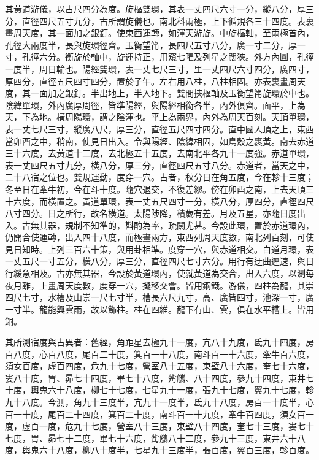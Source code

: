 \begin{pinyinscope}
 其黃道游儀，以古尺四分為度。旋樞雙環，其表一丈四尺六寸一分，縱八分，厚三分，直徑四尺五寸九分，古所謂旋儀也。南北科兩極，上下循規各三十四度。表裏畫周天度，其一面加之銀釘。使東西運轉，如渾天游旋。中旋樞軸，至兩極首內，孔徑大兩度半，長與旋環徑齊。玉衡望筩，長四尺五寸八分，廣一寸二分，厚一寸，孔徑六分。衡旋於軸中，旋運持正，用窺七曜及列星之闊狹。外方內圓，孔徑一度半，周日輪也。陽經雙環，表一丈七尺三寸，里一丈四尺六寸四分，廣四寸，厚四分，直徑五尺四寸四分，置於子午。左右用八柱，八柱相固。亦表裏畫周天度，其一面加之銀釘。半出地上，半入地下。雙間挾樞軸及玉衡望筩旋環於中也。陰緯單環，外內廣厚周徑，皆準陽經，與陽經相銜各半，內外俱齊。面平，上為天，下為地。橫周陽環，謂之陰渾也。平上為兩界，內外為周天百刻。天頂單環，表一丈七尺三寸，縱廣八尺，厚三分，直徑五尺四寸四分。直中國人頂之上，東西當卯酉之中，稍南，使見日出入。令與陽經、陰緯相固，如鳥殼之裹黃。南去赤道三十六度，去黃道十二度，去北極五十五度，去南北平各九十一度強。赤道單環，表一丈四尺五寸九分，橫八分，厚三分，直徑四尺五寸八分。赤道者，當天之中，二十八宿之位也。雙規運動，度穿一穴。古者，秋分日在角五度，今在軫十三度；冬至日在牽牛初，今在斗十度。隨穴退交，不復差繆。傍在卯酉之南，上去天頂三十六度，而橫置之。黃道單環，表一丈五尺四寸一分，橫八分，厚四分，直徑四尺八寸四分。日之所行，故名橫道。太陽陟降，積歲有差。月及五星，亦隨日度出入。古無其器，規制不知準的，斟酌為率，疏闊尤甚。今設此環，置於赤道環內，仍開合使運轉，出入四十八度，而極畫兩方，東西列周天度數，南北列百刻，可使見日知時。上列三百六十策，與用卦相準。度穿一穴，與赤道相交。白道月環，表一丈五尺一寸五分，橫八分，厚三分，直徑四尺七寸六分。用行有迂曲遲速，與日行緩急相及。古亦無其器，今設於黃道環內，使就黃道為交合，出入六度，以測每夜月離，上畫周天度數，度穿一穴，擬移交會。皆用鋼鐵。游儀，四柱為龍，其崇四尺七寸，水槽及山崇一尺七寸半，槽長六尺九寸，高、廣皆四寸，池深一寸，廣一寸半。龍能興雲雨，故以飾柱。柱在四維。龍下有山、雲，俱在水平槽上。皆用銅。



 其所測宿度與古異者：舊經，角距星去極九十一度，亢八十九度，氐九十四度，房百八度，心百八度，尾百二十度，箕百一十八度，南斗百一十六度，牽牛百六度，須女百度，虛百四度，危九十七度，營室八十五度，東壁八十六度，奎七十六度，婁八十度，胃、昴七十四度，畢七十八度，觜觿、八十四度，參九十四度，東井七十度，輿鬼六十八度，柳七十七度，七星九十一度，張九十七度，翼九十七度，軫九十八度。今測，角九十三度半，亢九十一度半，氐九十八度，房百一十度半，心百一十度，尾百二十四度，箕百二十度，南斗百一十九度，牽牛百四度，須女百一度，虛百一度，危九十七度，營室八十三度，東壁八十四度，奎七十三度，婁七十七度，胃、昴七十二度，畢七十六度，觜觿八十二度，參九十三度，東井六十八度，輿鬼六十八度，柳八十度半，七星九十三度半，張百度，翼百三度，軫百度。




\end{pinyinscope}
